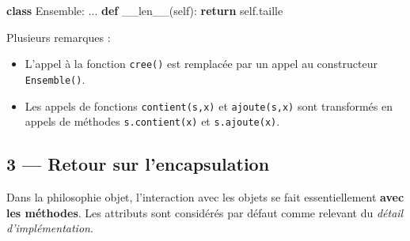 \documentclass[a4paper,17pt]{extarticle}
\providecommand{\tightlist}{%
      \setlength{\itemsep}{0pt}\setlength{\parskip}{0pt}}
\newenvironment{Shaded}{}{}
\newcommand{\KeywordTok}[1]{\textcolor[rgb]{0.00,0.44,0.13}{\textbf{{#1}}}}
\newcommand{\FunctionTok}[1]{\textcolor[rgb]{0.02,0.16,0.49}{{#1}}}
\newcommand{\NormalTok}[1]{{#1}}
\newcommand{\VariableTok}[1]{\textcolor[rgb]{0.10,0.09,0.49}{{#1}}}
\newcommand{\ControlFlowTok}[1]{\textcolor[rgb]{0.00,0.44,0.13}{\textbf{{#1}}}}
\begin{document}
\begin{Shaded}
\begin{Highlighting}[]
\KeywordTok{class}\NormalTok{ Ensemble:}
\NormalTok{    ...}
    \KeywordTok{def} \FunctionTok{\_\_len\_\_}\NormalTok{(}\VariableTok{self}\NormalTok{):}
        \ControlFlowTok{return} \VariableTok{self}\NormalTok{.taille}
\end{Highlighting}
\end{Shaded}
\begin{remarque}
    Plusieurs remarques :

\begin{itemize}
\tightlist
\item
  L'appel à la fonction \texttt{cree()} est remplacée par un appel au
  constructeur \texttt{Ensemble()}.
\item
  Les appels de fonctions \texttt{contient(s,x)} et \texttt{ajoute(s,x)}
  sont transformés en appels de méthodes \texttt{s.contient(x)} et
  \texttt{s.ajoute(x)}.
\end{itemize}

        \end{remarque}
    \hypertarget{retour-sur-lencapsulation}{%
\subsection{3 --- Retour sur
l'encapsulation}\label{retour-sur-lencapsulation}}

    Dans la philosophie objet, l'interaction avec les objets se fait
essentiellement \textbf{avec les méthodes}. Les attributs sont
considérés par défaut comme relevant du \emph{détail d'implémentation}.
\end{document}
